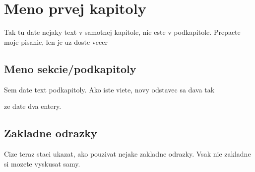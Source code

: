 
\chapter{Meno prvej kapitoly}\label{chap:prva}
\pagestyle{headings}

Tak tu date nejaky text v samotnej kapitole, nie este v podkapitole. Prepacte moje pisanie, len je uz doste vecer


\section{Meno sekcie/podkapitoly}\label{sec:firstoffirst}

Sem date text podkapitoly. Ako iste viete, novy odstavec sa dava tak 

ze date dva entery.

\section{Zakladne odrazky}

Cize teraz staci ukazat, ako pouzivat nejake zakladne odrazky. Vsak nie zakladne si mozete vyskusat samy.

